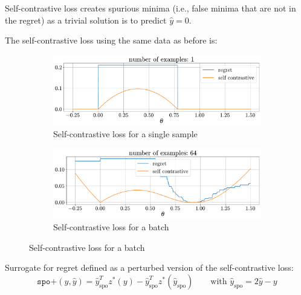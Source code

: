 \begin{description}
\begin{description}
                \begin{remark}
                    Self-contrastive loss creates spurious minima (i.e., false minima that are not in the regret) as a trivial solution is to predict $\hat{y} = 0$.
                \end{remark}

                \begin{example}
                    The self-contrastive loss using the same data as before is:
                    \begin{figure}[H]
                        \centering
                        \begin{subfigure}{0.49\linewidth}
                            \centering
                            \includegraphics[width=\linewidth]{./img/_dfl_self_contrastive_example1.pdf}
                            \caption{Self-contrastive loss for a single sample}
                        \end{subfigure}
                        \begin{subfigure}{0.49\linewidth}
                            \centering
                            \includegraphics[width=\linewidth]{./img/_dfl_self_contrastive_example2.pdf}
                            \caption{Self-contrastive loss for a batch}
                        \end{subfigure}
                    \end{figure}
                \end{example}

            \item[SPO+ loss] 
                Surrogate for regret defined as a perturbed version of the self-contrastive loss:
                \[ 
                    \texttt{spo+}(y, \hat{y}) = \hat{y}^T_\text{spo} z^*(y) - \hat{y}^T_\text{spo} z^*(\hat{y}_\text{spo}) \qquad \text{with } \hat{y}_\text{spo} = 2 \hat{y} - y
                \]


\end{description}
\end{description}
